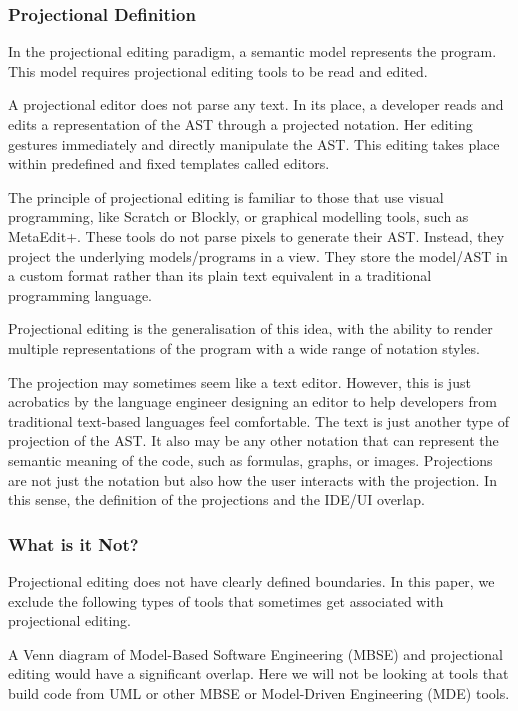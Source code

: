 \subsubsection{Projectional Definition}

In the projectional editing paradigm, a semantic model represents the program.
This model requires projectional editing tools to be read and edited.

A projectional editor does not parse any text.
In its place, a developer reads and edits a representation of the AST through a projected notation.
Her editing gestures immediately and directly manipulate the AST.
This editing takes place within predefined and fixed templates called editors.

The principle of projectional editing is familiar to those that use visual programming, like Scratch or Blockly, or graphical modelling tools, such as MetaEdit+.
These tools do not parse pixels to generate their AST.
Instead, they project the underlying models/programs in a view.
They store the model/AST in a custom format rather than its plain text equivalent in a traditional programming language.

Projectional editing is the generalisation of this idea, with the ability to render multiple representations of the program with a wide range of notation styles.

The projection may sometimes seem like a text editor. 
However, this is just acrobatics by the language engineer designing an editor to help developers from traditional text-based languages feel comfortable.
The text is just another type of projection of the AST.
It also may be any other notation that can represent the semantic meaning of the code, such as formulas, graphs, or images.
Projections are not just the notation but also how the user interacts with the projection.
In this sense, the definition of the projections and the IDE/UI overlap.

\subsubsection{What is it Not?}

Projectional editing does not have clearly defined boundaries.
In this paper, we exclude the following types of tools that sometimes get associated with projectional editing.

A Venn diagram of Model-Based Software Engineering (MBSE) and projectional editing would have a significant overlap.
Here we will not be looking at tools that build code from UML or other MBSE or Model-Driven Engineering (MDE) tools.

